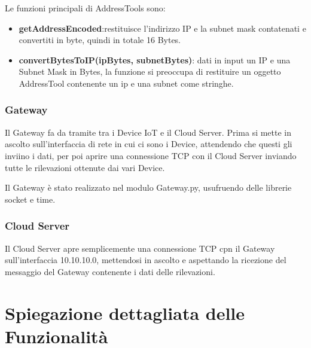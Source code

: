 \documentclass[a4paper,12pt]{report}
\begin{document}
	Le funzioni principali di AddressTools sono:
	\begin{itemize}
		\item \textbf{getAddressEncoded}:restituisce l'indirizzo IP e la subnet mask contatenati e convertiti in byte, quindi in totale 16 Bytes.
		\item \textbf{convertBytesToIP(ipBytes, subnetBytes)}: dati in input un IP e una Subnet Mask in Bytes, la funzione si preoccupa di restituire un oggetto AddressTool contenente un ip e una subnet come stringhe.
	\end{itemize}

	\subsection{Gateway}
	Il Gateway fa da tramite tra i Device IoT e il Cloud Server. Prima si mette in ascolto sull'interfaccia di rete in cui ci sono i Device, attendendo che questi gli inviino i dati, per poi aprire una connessione TCP con il Cloud Server inviando tutte le rilevazioni ottenute dai vari Device.
	
	Il Gateway è stato realizzato nel modulo Gateway.py, usufruendo delle librerie socket e time.
	
	
	\subsection{Cloud Server}
	Il Cloud Server apre semplicemente una connessione TCP cpn il Gateway sull'interfaccia 10.10.10.0, mettendosi in ascolto e aspettando la ricezione del messaggio del Gateway contenente i dati delle rilevazioni.
	
	\chapter{Spiegazione dettagliata delle Funzionalità}
\end{document}

